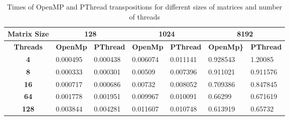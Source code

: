 \documentclass[10pt,onecolumn]{article}
\begin{document}
\begin{table}[htpb!]
\centering
\caption{Times of OpenMP and PThread transpositions for different sizes of matrices and number of threads}
\label{my-label}
\begin{tabular}{|c|l|l|l|l|l|l|}
\hline
\textbf{Matrix Size} & \multicolumn{2}{c|}{\textbf{128}}                                            & \multicolumn{2}{c|}{\textbf{1024}}                                           & \multicolumn{2}{c|}{\textbf{8192}}                                             \\ \hline
\textbf{Threads}     & \multicolumn{1}{c|}{\textbf{OpenMp}} & \multicolumn{1}{c|}{\textbf{PThread}} & \multicolumn{1}{c|}{\textbf{OpenMp}} & \multicolumn{1}{c|}{\textbf{PThread}} & \multicolumn{1}{c|}{\textbf{OpenMp\}}} & \multicolumn{1}{c|}{\textbf{PThread}} \\ \hline
\textbf{4}           & 0.000495                             & 0.000438                              & 0.006074                             & 0.011141                              & 0.928543                               & 1.20085                               \\ \hline
\textbf{8}           & 0.000333                             & 0.000301                              & 0.00509                              & 0.007396                              & 0.911021                               & 0.911576                              \\ \hline
\textbf{16}          & 0.000717                             & 0.000686                              & 0.00732                              & 0.008052                              & 0.709386                               & 0.847845                              \\ \hline
\textbf{64}          & 0.001778                             & 0.001951                              & 0.009967                             & 0.010091                              & 0.66299                                & 0.671619                              \\ \hline
\textbf{128}         & 0.003844                             & 0.004281                              & 0.011607                             & 0.010748                              & 0.613919                               & 0.65732                               \\ \hline
\end{tabular}
\end{table}

\newpage
\end{document}
